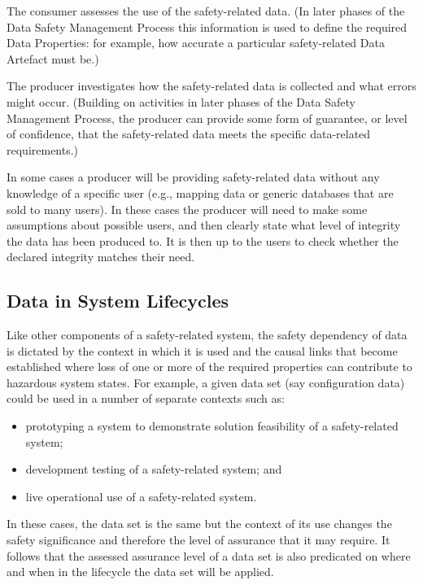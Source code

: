 The consumer assesses the use of the safety-related data. (In later phases of the Data Safety Management Process this information is used to define the required Data Properties: for example, how accurate a particular safety-related Data Artefact must be.)

The producer investigates how the safety-related data is collected and what errors might occur. (Building on activities in later phases of the Data Safety Management Process, the producer can provide some form of guarantee, or level of confidence, that the safety-related data meets the specific data-related requirements.)

In some cases a producer will be providing safety-related data without any knowledge of a specific user (e.g., mapping data or generic databases that are sold to many users). In these cases the producer will need to make some assumptions about possible users, and then clearly state what level of integrity the data has been produced to. It is then up to the users to check whether the declared integrity matches their need.

\subsection{Data in System Lifecycles}
Like other components of a safety-related system, the safety dependency of data is dictated by the context in which it is used and the causal links that become established where loss of one or more of the required properties can contribute to hazardous system states. For example, a given data set (say \gls{configuration data}) could be used in a number of separate contexts such as:
\begin{itemize}
  \item prototyping a system to demonstrate solution feasibility of a safety-related system;
  \item development testing of a safety-related system; and
  \item live operational use of a safety-related system.
\end{itemize}

In these cases, the data set is the same but the context of its use changes the safety significance and therefore the level of assurance that it may require. It follows that the assessed assurance level of a data set is also predicated on where and when in the lifecycle the data set will be applied. 

